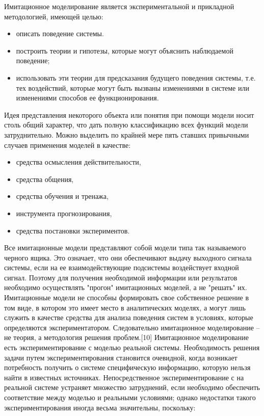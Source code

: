     Имитационное моделирование является экспериментальной и прикладной методологией, имеющей целью:

\begin{itemize}
    \item описать поведение системы.
    \item построить теории и гипотезы, которые могут объяснить наблюдаемой поведение;
    \item использовать эти теории для предсказания будущего поведения системы, т.е. тех воздействий, которые могут быть вызваны изменениями в системе или изменениями способов ее функционирования.
\end{itemize}

  Идея представления некоторого объекта или понятия при помощи модели носит столь общий характер, что дать полную классификацию всех функций модели затруднительно. Можно выделить по крайней мере пять ставших привычными случаев применения моделей в качестве:

\begin{itemize}
    \item средства осмысления действительности,
    \item средства общения,
    \item средства обучения и тренажа,
    \item инструмента прогнозирования,
    \item средства постановки экспериментов.
\end{itemize}

    Все имитационные модели представляют собой модели типа так называемого черного ящика. Это означает, что они обеспечивают выдачу выходного сигнала системы, если на ее взаимодействующие подсистемы воздействует входной сигнал. Поэтому для получения необходимой информации или результатов необходимо осуществлять "прогон" имитационных моделей, а не "решать" их. Имитационные модели не способны формировать свое собственное решение в том виде, в котором это имеет место в аналитических моделях, а могут лишь служить в качестве средства для анализа поведения систем в условиях, которые определяются экспериментатором. Следовательно имитационное моделирование -- не теория, а методология решения проблем.[10]
    Имитационное моделирование есть экспериментирование с моделью реальной системы. Необходимость решения задачи путем экспериментирования становится очевидной, когда возникает потребность получить о системе специфическую информацию, которую нельзя найти в известных источниках. Непосредственное экспериментирование с на реальной системе устраняет множество затруднений, если необходимо обеспечить соответствие между моделью и реальными условиями; однако недостатки такого экспериментирования иногда весьма значительны, поскольку:

